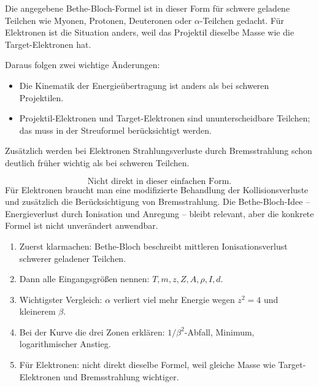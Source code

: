 \documentclass[11pt,a4paper]{scrartcl}
\theoremstyle{definition}
\theoremstyle{plain}
\theoremstyle{remark}
\begin{document}
\begin{calculationbox}
Die angegebene Bethe-Bloch-Formel ist in dieser Form f\"ur schwere geladene Teilchen wie Myonen, Protonen, Deuteronen oder $\alpha$-Teilchen gedacht. F\"ur Elektronen ist die Situation anders, weil das Projektil dieselbe Masse wie die Target-Elektronen hat.

Daraus folgen zwei wichtige \"Anderungen:
\begin{itemize}
    \item Die Kinematik der Energie\"ubertragung ist anders als bei schweren Projektilen.
    \item Projektil-Elektronen und Target-Elektronen sind ununterscheidbare Teilchen; das muss in der Streuformel ber\"ucksichtigt werden.
\end{itemize}
Zus\"atzlich werden bei Elektronen Strahlungsverluste durch Bremsstrahlung schon deutlich fr\"uher wichtig als bei schweren Teilchen.
\end{calculationbox}

\begin{answerbox}
\[
    \boxed{\text{Nicht direkt in dieser einfachen Form.}}
\]
F\"ur Elektronen braucht man eine modifizierte Behandlung der Kollisionsverluste und zus\"atzlich die Ber\"ucksichtigung von Bremsstrahlung. Die Bethe-Bloch-Idee -- Energieverlust durch Ionisation und Anregung -- bleibt relevant, aber die konkrete Formel ist nicht unver\"andert anwendbar.
\end{answerbox}

\begin{summarybox}[title=Tafelvortrag zu Aufgabe 3]
\begin{enumerate}
    \item Zuerst klarmachen: Bethe-Bloch beschreibt mittleren Ionisationsverlust schwerer geladener Teilchen.
    \item Dann alle Eingangsgr\"o\ss{}en nennen: $T,m,z,Z,A,\rho,I,d$.
    \item Wichtigster Vergleich: $\alpha$ verliert viel mehr Energie wegen $z^2=4$ und kleinerem $\beta$.
    \item Bei der Kurve die drei Zonen erkl\"aren: $1/\beta^2$-Abfall, Minimum, logarithmischer Anstieg.
    \item F\"ur Elektronen: nicht direkt dieselbe Formel, weil gleiche Masse wie Target-Elektronen und Bremsstrahlung wichtiger.
\end{enumerate}
\end{summarybox}

\FloatBarrier
\newpage
\end{document}
